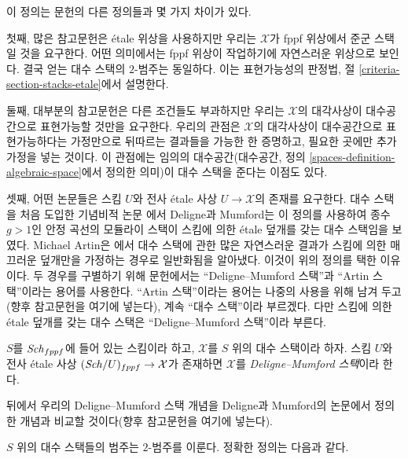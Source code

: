 \noindent
이 정의는 문헌의 다른 정의들과 몇 가지 차이가 있다.

\medskip\noindent
첫째, 많은 참고문헌은 \'etale 위상을 사용하지만 우리는 $\mathcal{X}$가
fppf 위상에서 준군 스택일 것을 요구한다. 어떤 의미에서는 fppf 위상이
작업하기에 자연스러운 위상으로 보인다. 결국 얻는 대수 스택의 $2$-범주는
동일하다. 이는 표현가능성의 판정법, 절
\ref{criteria-section-stacks-etale}에서 설명한다.

\medskip\noindent
둘째, 대부분의 참고문헌은 다른 조건들도 부과하지만 우리는
$\mathcal{X}$의 대각사상이 대수공간으로 표현가능할 것만을 요구한다.
우리의 관점은 $\mathcal{X}$의 대각사상이 대수공간으로 표현가능하다는
가정만으로 뒤따르는 결과들을 가능한 한 증명하고, 필요한 곳에만 추가
가정을 넣는 것이다. 이 관점에는 임의의 대수공간(대수공간, 정의
\ref{spaces-definition-algebraic-space}에서 정의한 의미)이 대수 스택을
준다는 이점도 있다.

\medskip\noindent
셋째, 어떤 논문들은 스킴 $U$와 전사 \'etale 사상
$U \to \mathcal{X}$의 존재를 요구한다. 대수 스택을 처음 도입한 기념비적
논문 \cite{DM}에서 Deligne과 Mumford는 이 정의를 사용하여 종수
$g > 1$인 안정 곡선의 모듈라이 스택이 스킴에 의한 \'etale 덮개를 갖는
대수 스택임을 보였다. Michael Artin은 \cite{ArtinVersal}에서 대수 스택에
관한 많은 자연스러운 결과가 스킴에 의한 매끄러운 덮개만을 가정하는
경우로 일반화됨을 알아냈다. 이것이 위의 정의를 택한 이유이다. 두 경우를
구별하기 위해 문헌에서는 ``Deligne--Mumford 스택''과 ``Artin 스택''이라는
용어를 사용한다. ``Artin 스택''이라는 용어는 나중의 사용을 위해 남겨
두고(향후 참고문헌을 여기에 넣는다), 계속 ``대수 스택''이라 부르겠다.
다만 스킴에 의한 \'etale 덮개를 갖는 대수 스택은
``Deligne--Mumford 스택''이라 부른다.

\begin{definition}
\label{definition-deligne-mumford}
$S$를 $\mathit{Sch}_{fppf}$에 들어 있는 스킴이라 하고, $\mathcal{X}$를
$S$ 위의 대수 스택이라 하자. 스킴 $U$와 전사 \'etale 사상
$(\mathit{Sch}/U)_{fppf} \to \mathcal{X}$가 존재하면 $\mathcal{X}$를
{\it Deligne--Mumford 스택}이라 한다.
\end{definition}

\noindent
뒤에서 우리의 Deligne--Mumford 스택 개념을 Deligne과 Mumford의 논문에서
정의한 개념과 비교할 것이다(향후 참고문헌을 여기에 넣는다).

\medskip\noindent
$S$ 위의 대수 스택들의 범주는 $2$-범주를 이룬다. 정확한 정의는 다음과
같다.


